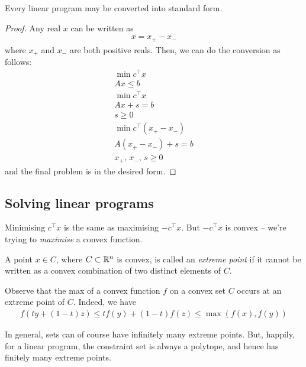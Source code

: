 \documentclass{../template/note}
\begin{document}
    \begin{proposition}
        Every linear program may be converted into standard form.
    \end{proposition}
    
    \begin{proof}
        Any real $x$ can be written as
        \begin{align*}
            x = x_+ - x_-
        \end{align*}
        where $x_+$ and $x_-$ are both positive reals. Then, we can do the conversion as follows:
        \begin{align*}
            \min c^\intercal x \\
            Ax \leq b \\[10pt]
            \min c^\intercal x \\
            Ax + s = b \\
            s \geq 0 \\[10pt]
            \min c^\intercal (x_+ - x_-) \\
            A(x_+-x_-) + s = b \\
            x_+,\, x_-,\, s \geq 0
        \end{align*}
        and the final problem is in the desired form.       
    \end{proof}

    \subsection{Solving linear programs}

    Minimising $c^\intercal x$ is the same as maximising $-c^\intercal x$. But $-c^\intercal x$ is convex -- we're trying to \emph{maximise} a convex function.
    
    \begin{definition}
        A point $x \in C$, where $C \subset \mathbb R^n$ is convex, is called an \emph{extreme point} if it cannot be written as a convex combination of two distinct elements of $C$.
    \end{definition}
    
    Observe that the max of a convex function $f$ on a convex set $C$ occurs at an extreme point of $C$. Indeed, we have
    \begin{align*}
        f(ty + (1-t)z) \leq tf(y) + (1-t)f(z) \leq \max(f(x), f(y))
    \end{align*}
    
    In general, sets can of course have infinitely many extreme points. But, happily, for a linear program, the constraint set is always a polytope, and hence has finitely many extreme points.
    
\end{document}
